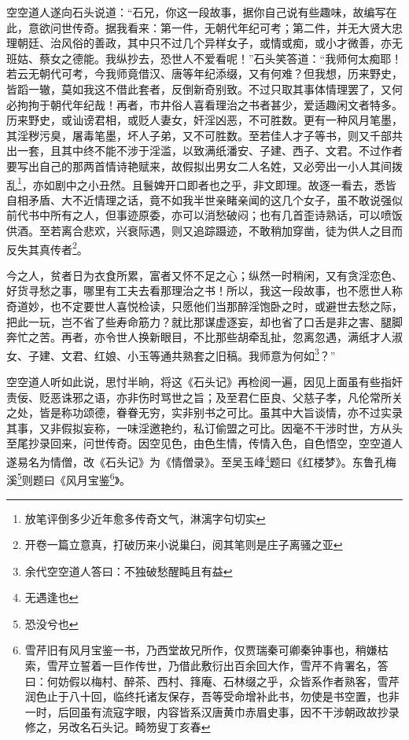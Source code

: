 \documentclass[12pt,oneside]{book}
\begin{document}
空空道人遂向石头说道：“石兄，你这一段故事，据你自己说有些趣味，故编写在此，意欲问世传奇。据我看来：第一件，无朝代年纪可考；第二件，并无大贤大忠理朝廷、治风俗的善政，其中只不过几个异样女子，或情或痴，或小才微善，亦无班姑、蔡女之德能。我纵抄去，恐世人不爱看呢！”石头笑答道：“我师何太痴耶！若云无朝代可考，今我师竟借汉、唐等年纪添缀，又有何难？但我想，历来野史，皆蹈一辙，莫如我这不借此套者，反倒新奇别致。不过只取其事体情理罢了，又何必拘拘于朝代年纪哉！再者，市井俗人喜看理治之书者甚少，爱适趣闲文者特多。历来野史，或讪谤君相，或贬人妻女，奸淫凶恶，不可胜数。更有一种风月笔墨，其淫秽污臭，屠毒笔墨，坏人子弟，又不可胜数。至若佳人才子等书，则又千部共出一套，且其中终不能不涉于淫滥，以致满纸潘安、子建、西子、文君。不过作者要写出自己的那两首情诗艳赋来，故假拟出男女二人名姓，又必旁出一小人其间拨乱\footnote{放笔评倒多少近年愈多传奇文气，淋漓字句切实}，亦如剧中之小丑然。且鬟婢开口即者也之乎，非文即理。故逐一看去，悉皆自相矛盾、大不近情理之话，竟不如我半世亲睹亲闻的这几个女子，虽不敢说强似前代书中所有之人，但事迹原委，亦可以消愁破闷；也有几首歪诗熟话，可以喷饭供酒。至若离合悲欢，兴衰际遇，则又追踪蹑迹，不敢稍加穿凿，徒为供人之目而反失其真传者\footnote{开卷一篇立意真，打破历来小说巢臼，阅其笔则是庄子离骚之亚}。

今之人，贫者日为衣食所累，富者又怀不足之心；纵然一时稍闲，又有贪淫恋色、好货寻愁之事，哪里有工夫去看那理治之书！所以，我这一段故事，也不愿世人称奇道妙，也不定要世人喜悦检读，只愿他们当那醉淫饱卧之时，或避世去愁之际，把此一玩，岂不省了些寿命筋力？就比那谋虚逐妄，却也省了口舌是非之害、腿脚奔忙之苦。再者，亦令世人换新眼目，不比那些胡牵乱扯，忽离忽遇，满纸才人淑女、子建、文君、红娘、小玉等通共熟套之旧稿。我师意为何如\footnote{余代空空道人答曰：不独破愁醒盹且有益}？”

空空道人听如此说，思忖半晌，将这《石头记》再检阅一遍，因见上面虽有些指奸责佞、贬恶诛邪之语，亦非伤时骂世之旨；及至君仁臣良、父慈子孝，凡伦常所关之处，皆是称功颂德，眷眷无穷，实非别书之可比。虽其中大旨谈情，亦不过实录其事，又非假拟妄称，一味淫邀艳约，私订偷盟之可比。因毫不干涉时世，方从头至尾抄录回来，问世传奇。因空见色，由色生情，传情入色，自色悟空，空空道人遂易名为情僧，改《石头记》为《情僧录》。至吴玉峰\footnote{无遇逢也}题曰《红楼梦》。东鲁孔梅溪\footnote{恐没兮也}则题曰《风月宝鉴\footnote{雪芹旧有风月宝鉴一书，乃西堂故兄所作，仅贾瑞秦可卿秦钟事也，稍嫌枯索，雪芹立誓着一巨作传世，乃借此敷衍出百余回大作，雪芹不肯署名，答曰：何妨假以梅村、醉茶、西村、箨庵、石林缀之乎，众皆系作者熟客，雪芹润色止于八十回，临终托诸友保存，吾等受命增补此书，勿使是书空置，也非一时，后回虽有流寇字眼，内容皆系汉唐黄巾赤眉史事，因不干涉朝政故抄录修之，另改名石头记。畸笏叟丁亥春}》。
\end{document}

